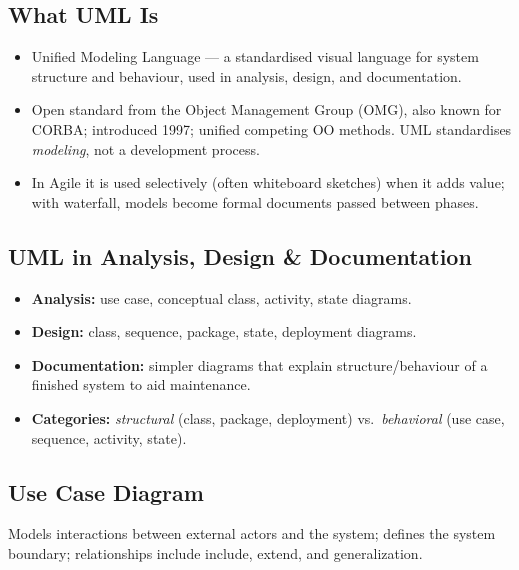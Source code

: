 \documentclass[hidelinks]{article}
\begin{document}
\subsection{What UML Is}
\begin{itemize}
  \item Unified Modeling Language --- a standardised visual language for system structure and
        behaviour, used in analysis, design, and documentation.
  \item Open standard from the Object Management Group (OMG), also known for CORBA; introduced 1997;
        unified competing OO methods. UML standardises \emph{modeling}, not a development process.
  \item In Agile it is used selectively (often whiteboard sketches) when it adds value; with
        waterfall, models become formal documents passed between phases.
\end{itemize}

\subsection{UML in Analysis, Design \& Documentation}
\begin{itemize}
  \item \textbf{Analysis:} use case, conceptual class, activity, state diagrams.
  \item \textbf{Design:} class, sequence, package, state, deployment diagrams.
  \item \textbf{Documentation:} simpler diagrams that explain structure/behaviour of a finished
        system to aid maintenance.
  \item \textbf{Categories:} \emph{structural} (class, package, deployment) vs.\ \emph{behavioral}
        (use case, sequence, activity, state).
\end{itemize}

\subsection{Use Case Diagram}
Models interactions between external actors and the system; defines the system boundary;
relationships include include, extend, and generalization.
\end{document}
